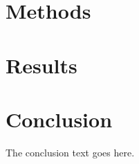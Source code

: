 \documentclass[nocrop,final,onecolumn,openacc]{bluetechreport}
\begin{document}
\section{Methods}

\section{Results}

\section{Conclusion}
The conclusion text goes here.\vskip6pt

\enlargethispage{20pt}





%
%
\end{document}
